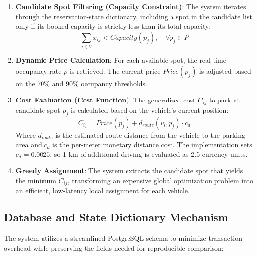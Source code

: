 \documentclass[conference]{IEEEtran}
\begin{document}
\begin{enumerate}
    \item \textbf{Candidate Spot Filtering (Capacity Constraint)}:
          The system iterates through the reservation-state dictionary, including a spot in the candidate list only if its booked capacity is strictly less than its total capacity:
          \begin{equation}
              \sum_{i \in V} x_{ij} < Capacity(p_j), \quad \forall p_j \in P
          \end{equation}

    \item \textbf{Dynamic Price Calculation}:
          For each available spot, the real-time occupancy rate $\rho$ is retrieved. The current price $Price(p_j)$ is adjusted based on the 70\% and 90\% occupancy thresholds.

    \item \textbf{Cost Evaluation (Cost Function)}:
          The generalized cost $C_{ij}$ to park at candidate spot $p_j$ is calculated based on the vehicle's current position:
          \begin{equation}
              C_{ij} = Price(p_j) + d_{route}(v_i, p_j) \cdot c_d
          \end{equation}
          Where $d_{route}$ is the estimated route distance from the vehicle to the parking area and $c_d$ is the per-meter monetary distance cost. The implementation sets $c_d=0.0025$, so 1 km of additional driving is evaluated as 2.5 currency units.

    \item \textbf{Greedy Assignment}:
          The system extracts the candidate spot that yields the minimum $C_{ij}$, transforming an expensive global optimization problem into an efficient, low-latency local assignment for each vehicle.
\end{enumerate}

\subsection{Database and State Dictionary Mechanism}
The system utilizes a streamlined PostgreSQL schema to minimize transaction overhead while preserving the fields needed for reproducible comparison:
\end{document}
